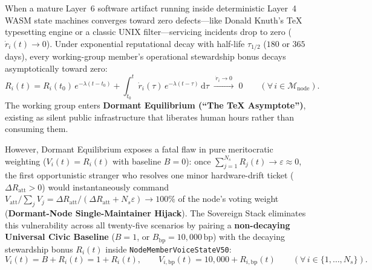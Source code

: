 When a mature Layer~6 software artifact running inside deterministic Layer~4 WASM state machines converges toward
zero defects---like Donald Knuth's \TeX{} typesetting engine or a classic UNIX filter---servicing incidents drop to
zero ($\dot{r}_i(t) \to 0$). Under exponential reputational decay with half-life $\tau_{1/2}$ ($180$ or $365$ days),
every working-group member's operational stewardship bonus decays asymptotically toward zero:
\begin{equation}
    R_i(t) = R_i(t_0)\,e^{-\lambda(t - t_0)} + \int_{t_0}^{t} \dot{r}_i(\tau)\,e^{-\lambda(t - \tau)}\,\mathrm{d}\tau \;\xrightarrow{\;\dot{r}_i \to 0\;}\; 0 \qquad (\forall\,i \in \mathcal{M}_{\mathrm{node}}).
    \label{eq:zero-rep-decay}
\end{equation}
The working group enters \textbf{Dormant Equilibrium (``The \TeX{} Asymptote'')}, existing as silent public
infrastructure that liberates human hours rather than consuming them.

However, Dormant Equilibrium exposes a fatal flaw in pure meritocratic weighting ($V_i(t) = R_i(t)$ with baseline
$B=0$): once $\sum_{j=1}^{N_s} R_j(t) \to \varepsilon \approx 0$, the first opportunistic stranger who resolves one
minor hardware-drift ticket ($\Delta R_{\mathrm{att}} > 0$) would instantaneously command
$V_{\mathrm{att}} / \sum_j V_j = \Delta R_{\mathrm{att}} / (\Delta R_{\mathrm{att}} + N_s \varepsilon) \to 100\%$ of
the node's voting weight (\textbf{Dormant-Node Single-Maintainer Hijack}). The Sovereign Stack eliminates this
vulnerability across all twenty-five scenarios by pairing a \textbf{non-decaying Universal Civic Baseline}
($B = 1$, or $B_{\mathrm{bp}} = 10{,}000\,\mathrm{bp}$) with the decaying stewardship bonus $R_i(t)$ inside
\texttt{NodeMemberVoiceStateV50}:
\begin{equation}
    V_i(t) = B + R_i(t) = 1 + R_i(t), \qquad V_{i,\mathrm{bp}}(t) = 10{,}000 + R_{i,\mathrm{bp}}(t) \qquad (\forall\,i \in \{1,\dots,N_s\}).
    \label{eq:zero-unified-voice}
\end{equation}

